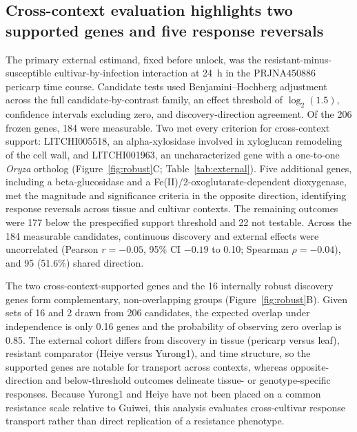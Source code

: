 \documentclass[referee,pdflatex,sn-basic,Numbered]{sn-jnl}
\begin{document}
\subsection{Cross-context evaluation highlights two supported genes and five response reversals}

The primary external estimand, fixed before unlock, was the resistant-minus-susceptible cultivar-by-infection interaction at 24~h in the PRJNA450886 pericarp time course. Candidate tests used Benjamini--Hochberg adjustment across the full candidate-by-contrast family, an effect threshold of $\log_2(1.5)$, confidence intervals excluding zero, and discovery-direction agreement. Of the 206 frozen genes, 184 were measurable. Two met every criterion for cross-context support: LITCHI005518, an alpha-xylosidase involved in xyloglucan remodeling of the cell wall, and LITCHI001963, an uncharacterized gene with a one-to-one \textit{Oryza} ortholog (Figure~\ref{fig:robust}C; Table~\ref{tab:external}). Five additional genes, including a beta-glucosidase and a Fe(II)/2-oxoglutarate-dependent dioxygenase, met the magnitude and significance criteria in the opposite direction, identifying response reversals across tissue and cultivar contexts. The remaining outcomes were 177 below the prespecified support threshold and 22 not testable. Across the 184 measurable candidates, continuous discovery and external effects were uncorrelated (Pearson $r=-0.05$, 95\% CI $-0.19$ to 0.10; Spearman $\rho=-0.04$), and 95 (51.6\%) shared direction.

The two cross-context-supported genes and the 16 internally robust discovery genes form complementary, non-overlapping groups (Figure~\ref{fig:robust}B). Given sets of 16 and 2 drawn from 206 candidates, the expected overlap under independence is only 0.16 genes and the probability of observing zero overlap is 0.85. The external cohort differs from discovery in tissue (pericarp versus leaf), resistant comparator (Heiye versus Yurong1), and time structure, so the supported genes are notable for transport across contexts, whereas opposite-direction and below-threshold outcomes delineate tissue- or genotype-specific responses. Because Yurong1 and Heiye have not been placed on a common resistance scale relative to Guiwei, this analysis evaluates cross-cultivar response transport rather than direct replication of a resistance phenotype.
\end{document}
